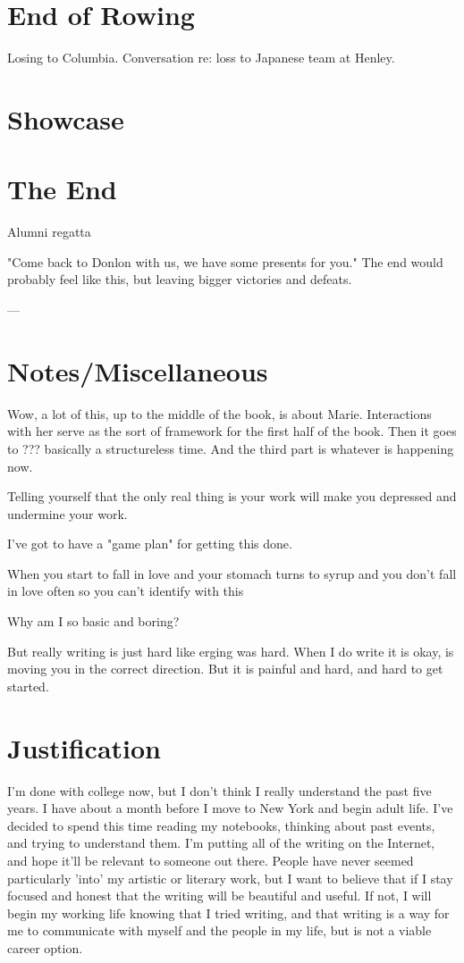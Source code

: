 \documentclass[12pt]{article}
\begin{document}
\section{End of Rowing}
Losing to Columbia.
Conversation re: loss to Japanese team at Henley.

\section{Showcase}


\section{The End}
Alumni regatta

"Come back to Donlon with us, we have some presents for you."
The end would probably feel like this, but leaving bigger victories and defeats.

---

\section{Notes/Miscellaneous}
Wow, a lot of this, up to the middle of the book, is about Marie.  Interactions
with her serve as the sort of framework for the first half of the book.  Then it
goes to ???  basically a structureless time.  And the third part is whatever is
happening now.

Telling yourself that the only real thing is your work will make you depressed
and undermine your work.  

I've got to have a "game plan" for getting this done.

When you start to fall in love
and your stomach turns to syrup
and you don't fall in love often
so you can't identify with this

Why am I so basic and boring?

But really writing is just hard like erging was hard.  When I do write it is
okay, is moving you in the correct direction.  But it is painful and hard, and
hard to get started.

\section{Justification}
I'm done with college now, but I don't think I really understand the past five
years.  I have about a month before I move to New York and begin adult life.
I've decided to spend this time reading my notebooks, thinking about past
events, and trying to understand them.  I'm putting all of the writing on the
Internet, and hope it'll be relevant to someone out there.  People have never
seemed particularly 'into' my artistic or literary work, but I want to believe
that if I stay focused and honest that the writing will be beautiful and
useful.  If not, I will begin my working life knowing that I tried writing, and
that writing is a way for me to communicate with myself and the people in my
life, but is not a viable career option.
\end{document}

